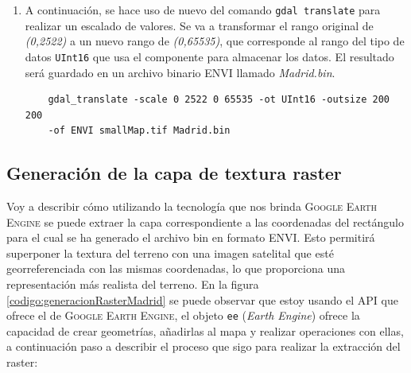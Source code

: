 \documentclass[a4paper, 11pt]{book}
\begin{document}
\begin{enumerate}
    \item A continuación, se hace uso de nuevo del comando \texttt{gdal translate} para realizar un escalado de valores. Se va a transformar el rango original de \emph{(0,2522)} a un nuevo rango de \emph{(0,65535)}, que corresponde al rango del tipo de datos \texttt{UInt16} que usa el componente para almacenar los datos. El resultado será guardado en un archivo binario \textsc{ENVI} llamado \emph{Madrid.bin}.

    {\scriptsize
    \begin{verbatim}
	gdal_translate -scale 0 2522 0 65535 -ot UInt16 -outsize 200 200 
	-of ENVI smallMap.tif Madrid.bin
    \end{verbatim}
    }
\end{enumerate}

\subsection{Generación de la capa de textura raster}
\label{sec:raster}
Voy a describir cómo utilizando la tecnología que nos brinda \textsc{Google Earth Engine} se puede extraer la capa  correspondiente a las coordenadas del rectángulo para el cual se ha generado el archivo bin en formato \textsc{ENVI}. Esto permitirá superponer la textura del terreno con una imagen satelital que esté georreferenciada con las mismas coordenadas, lo que proporciona una representación más realista del terreno.
En la figura \ref{codigo:generacionRasterMadrid} se puede observar que estoy usando el \textsc{API} que ofrece el  de \textsc{Google Earth Engine}, el objeto \texttt{ee} (\emph{Earth Engine}) ofrece la capacidad de crear geometrías, añadirlas al mapa y realizar operaciones con ellas, a continuación paso a describir el proceso que sigo para realizar la extracción del raster:
\end{document}

